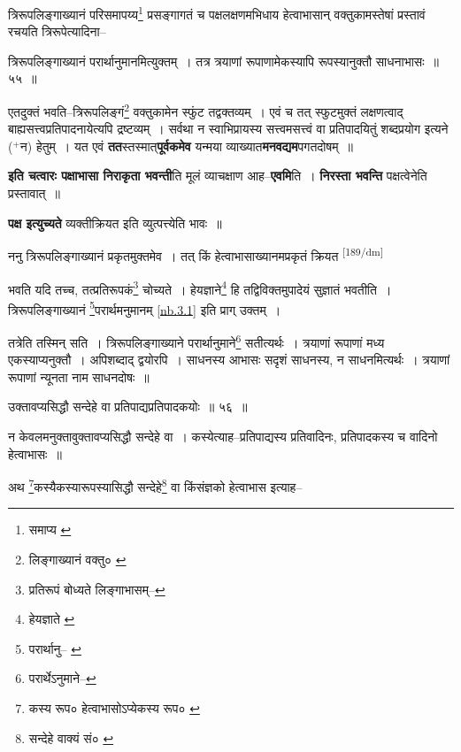 \documentclass[article,12pt,a4paper]{memoir}
\newcommand{\add}[1]{($^{+}$#1)}
\begin{document}
	त्रिरूपलिङ्गाख्यानं परिसमापय्य\footnote{समाप्य \cite{dp-edE}} प्रसङ्गागतं च पक्षलक्षणमभिधाय हेत्वाभासान् वक्तुकामस्तेषां प्रस्तावं रचयति त्रिरूपेत्यादिना-- 
	  
	त्रिरूपलिङ्गाख्यानं परार्थानुमानमित्युक्तम् । तत्र त्रयाणां रूपाणामेकस्यापि रूपस्यानुक्तौ साधनाभासः ॥ ५५ ॥ 
	  
	एतदुक्तं भवति--त्रिरूपलिङ्गं\footnote{लिङ्गाख्यानं वक्तु० \cite{dp-msA} \cite{dp-msB} \cite{dp-edP} \cite{dp-edH} \cite{dp-edE} \cite{dp-edN}} वक्तुकामेन स्फुंट तद्वक्तव्यम् । एवं च तत् स्फुटमुक्तं लक्षणत्वाद् बाह्यसत्त्वप्रतिपादनायेत्यपि द्रष्टव्यम् । सर्वथा न स्वाभिप्रायस्य सत्त्वमसत्त्वं वा प्रतिपादयितुं शब्दप्रयोग इत्यने \add{न} हेतुम् । यत एवं \textbf{तत}स्तस्मात्\textbf{पूर्वकमेव} यन्मया व्याख्यात\textbf{मनवद्यम}पगतदोषम् ॥
	\pend
      

	  \pstart \textbf{इति चत्वारः पक्षाभासा निराकृता भवन्ती}ति मूलं व्याचक्षाण आह--\textbf{एवमि}ति । \textbf{निरस्ता भवन्ति} पक्षत्वेनेति प्रस्तावात् ॥
	\pend
      

	  \pstart \textbf{पक्ष इत्युच्यते} व्यक्तीक्रियत इति व्युत्पत्त्येति भावः ॥
	\pend
      

	  \pstart ननु त्रिरूपलिङ्गाख्यानं प्रकृतमुक्तमेव । तत् किं हेत्वाभासाख्यानमप्रकृतं क्रियत  \leavevmode\textsuperscript{\rmlatinfont\tiny [189/dm]} 
	  
	भवति यदि तच्च, तत्प्रतिरूपकं\footnote{प्रतिरूपं बोध्यते \cite{dp-msA} \cite{dp-msB} \cite{dp-edP} \cite{dp-edH} लिङ्गाभासम्--\cite{dp-msD-n}} चोच्यते । हेयज्ञाने\footnote{हेयज्ञाते \cite{dp-edE}} हि तद्विविक्तमुपादेयं सुज्ञातं भवतीति । त्रिरूपलिङ्गाख्यानं \footnote{परार्थानु--\cite{dp-msA} \cite{dp-msB} \cite{dp-edP} \cite{dp-edH} \cite{dp-edE} \cite{dp-edN}}परार्थमनुमानम् \cref{nb.3.1} इति प्राग् उक्तम् । 
	  
	तत्रेति तस्मिन् सति । त्रिरूपलिङ्गाख्याने परार्थानुमाने\footnote{परार्थेऽनुमाने--\cite{dp-msC}} सतीत्यर्थः । त्रयाणां रूपाणां मध्य एकस्याप्यनुक्तौ । अपिशब्दाद् द्वयोरपि । साधनस्य आभासः सदृशं साधनस्य, न साधनमित्यर्थः । त्रयाणां रूपाणां न्यूनता नाम साधनदोषः ॥ 
	  
	उक्तावप्यसिद्धौ सन्देहे वा प्रतिपाद्यप्रतिपादकयोः ॥ ५६ ॥ 
	  
	न केवलमनुक्तावुक्तावप्यसिद्धौ सन्देहे वा । कस्येत्याह--प्रतिपाद्यस्य प्रतिवादिनः, प्रतिपादकस्य च वादिनो हेत्वाभासः ॥ 
	  
	अथ \footnote{कस्य रूप० \cite{dp-msA} \cite{dp-edP} \cite{dp-edH} \cite{dp-edE} \cite{dp-edN} हेत्वाभासोऽप्येकस्य रूप० \cite{dp-msC}}कस्यैकस्यारूपस्यासिद्धौ सन्देहे\footnote{सन्देहे वाक्यं सं० \cite{dp-msA}} वा किंसंज्ञको हेत्वाभास इत्याह-- 
	  
\end{document}
